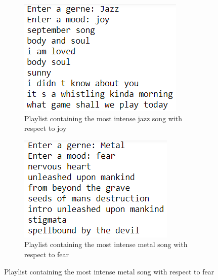 \documentclass[runningheads]{llncs}
\begin{document}
\begin{figure}
     \centering
     \caption{Example of playlists}
     \label{fig:playlist}
       \hfill
     \begin{subfigure}[b]{0.4\textwidth}
         \centering
         \includegraphics[width=\textwidth]{images/jazz_joy.PNG}
         \caption{Playlist containing the most intense jazz song with respect to joy}
         \label{fig:y equals x}
     \end{subfigure}
     \hfill
     \begin{subfigure}[b]{0.4\textwidth}
         \centering
         \includegraphics[width=\textwidth]{images/metal_fear.PNG}
         \caption{Playlist containing the most intense metal song with respect to fear}
         \label{fig:three sin x}
     \end{subfigure}
     \hfill
\end{figure}
\end{document}
